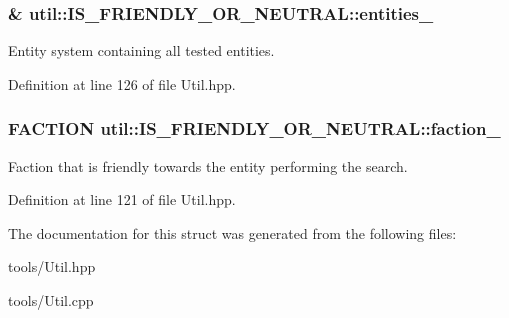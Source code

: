 \subsubsection[{\texorpdfstring{entities\+\_\+}{entities_}}]{\& util\+::\+I\+S\+\_\+\+F\+R\+I\+E\+N\+D\+L\+Y\+\_\+\+O\+R\+\_\+\+N\+E\+U\+T\+R\+A\+L\+::entities\+\_\+\hspace{0.3cm}{\ttfamily [private]}}\hypertarget{structutil_1_1_i_s___f_r_i_e_n_d_l_y___o_r___n_e_u_t_r_a_l_afb4fe556d2a7718a16265977cdac5ea1}{}\label{structutil_1_1_i_s___f_r_i_e_n_d_l_y___o_r___n_e_u_t_r_a_l_afb4fe556d2a7718a16265977cdac5ea1}


Entity system containing all tested entities. 



Definition at line 126 of file Util.\+hpp.

\subsubsection[{\texorpdfstring{faction\+\_\+}{faction_}}]{\setlength{\rightskip}{0pt plus 5cm}F\+A\+C\+T\+I\+ON util\+::\+I\+S\+\_\+\+F\+R\+I\+E\+N\+D\+L\+Y\+\_\+\+O\+R\+\_\+\+N\+E\+U\+T\+R\+A\+L\+::faction\+\_\+\hspace{0.3cm}{\ttfamily [private]}}\hypertarget{structutil_1_1_i_s___f_r_i_e_n_d_l_y___o_r___n_e_u_t_r_a_l_a99cf55fbf81903d19113710b0388a725}{}\label{structutil_1_1_i_s___f_r_i_e_n_d_l_y___o_r___n_e_u_t_r_a_l_a99cf55fbf81903d19113710b0388a725}


Faction that is friendly towards the entity performing the search. 



Definition at line 121 of file Util.\+hpp.



The documentation for this struct was generated from the following files\+:\begin{DoxyCompactItemize}
\item 
tools/Util.\+hpp\item 
tools/Util.\+cpp\end{DoxyCompactItemize}

